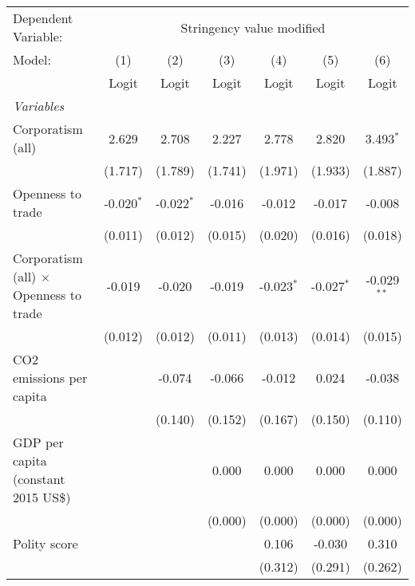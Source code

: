 
\begingroup
\centering
\begin{tabular}{lcccccc}
   \toprule
   Dependent Variable: & \multicolumn{6}{c}{Stringency value modified}\\
   Model:                                        & (1)          & (2)          & (3)     & (4)          & (5)          & (6)\\  
                                                 &  Logit       & Logit        & Logit   & Logit        & Logit        & Logit\\  
   \midrule
   \emph{Variables}\\
   Corporatism (all)                             & 2.629        & 2.708        & 2.227   & 2.778        & 2.820        & 3.493$^{*}$\\   
                                                 & (1.717)      & (1.789)      & (1.741) & (1.971)      & (1.933)      & (1.887)\\   
   Openness to trade                             & -0.020$^{*}$ & -0.022$^{*}$ & -0.016  & -0.012       & -0.017       & -0.008\\   
                                                 & (0.011)      & (0.012)      & (0.015) & (0.020)      & (0.016)      & (0.018)\\   
   Corporatism (all) $\times$ Openness to trade  & -0.019       & -0.020       & -0.019  & -0.023$^{*}$ & -0.027$^{*}$ & -0.029$^{**}$\\   
                                                 & (0.012)      & (0.012)      & (0.011) & (0.013)      & (0.014)      & (0.015)\\   
   CO2 emissions per capita                      &              & -0.074       & -0.066  & -0.012       & 0.024        & -0.038\\   
                                                 &              & (0.140)      & (0.152) & (0.167)      & (0.150)      & (0.110)\\   
   GDP per capita (constant 2015 US\$)           &              &              & 0.000   & 0.000        & 0.000        & 0.000\\   
                                                 &              &              & (0.000) & (0.000)      & (0.000)      & (0.000)\\   
   Polity score                                  &              &              &         & 0.106        & -0.030       & 0.310\\   
                                                 &              &              &         & (0.312)      & (0.291)      & (0.262)\\   

\end{tabular}
